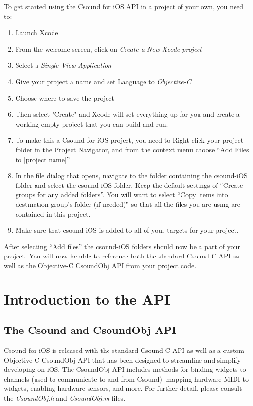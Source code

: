 \documentclass[11pt]{article}
\begin{document}
To get started using the Csound for iOS API in a project of your own, you need to:
 
\begin{enumerate}
\item Launch Xcode
\item From the welcome screen, click on \textit{Create a New Xcode project}
\item Select a \textit{Single View Application}
\item Give your project a name and set Language to \textit{Objective-C}
\item Choose where to save the project
\item Then select "Create" and Xcode will set everything up for you and create a working empty project that you can build and run.
\item To make this a Csound for iOS project, you need to Right-click your project folder in the Project Navigator, and from the context menu choose ``Add Files to [project name]''
\item In the file dialog that opens, navigate to the folder containing the csound-iOS folder and select the csound-iOS folder. Keep the default settings of ``Create groups for any added folders''.  You will want to select ``Copy items into destination group's folder (if needed)'' so that all the files you are using are contained in this project.
\item Make sure that csound-iOS is added to all of your targets for your project.
\end{enumerate}

After selecting ``Add files'' the csound-iOS folders should now be a part of your project.  You will now be able to reference both the standard Csound C API as well as the Objective-C CsoundObj API from your project code.


\section{Introduction to the API}
\subsection{The Csound and CsoundObj API}

Csound for iOS is released with the standard Csound C API as well as a custom Objective-C CsoundObj API that has been designed to streamline and simplify developing on iOS.  The CsoundObj API includes methods for binding widgets to channels (used to communicate to and from Csound), mapping hardware MIDI to widgets, enabling hardware sensors, and more.  For further detail, please consult the \textit{CsoundObj.h} and \textit{CsoundObj.m} files.
\end{document}
